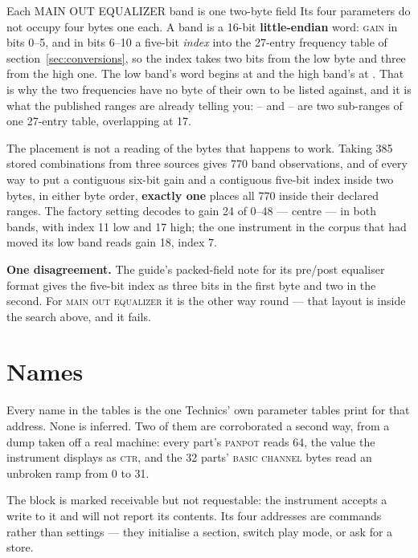 \begin{note}{Each MAIN OUT EQUALIZER band is one two-byte field}
Its four parameters do not occupy four bytes one each. A band is a 16-bit
\textbf{little-endian} word: \textsc{gain} in bits 0--5, and in bits 6--10 a five-bit
\emph{index} into the 27-entry frequency table of section~\ref{sec:conversions}, so the
index takes two bits from the low byte and three from the high one. The low band's word
begins at  and the high band's at . That is why the two
frequencies have no byte of their own to be listed against, and it is what the published
ranges are already telling you: -- and -- are two
sub-ranges of one 27-entry table, overlapping at 17.

The placement is not a reading of the bytes that happens to work. Taking 385 stored
combinations from three sources gives 770 band observations, and of every way to put a
contiguous six-bit gain and a contiguous five-bit index inside two bytes, in either byte
order, \textbf{exactly one} places all 770 inside their declared ranges. The factory
setting decodes to gain 24 of 0--48 --- centre --- in both bands, with index 11 low and 17
high; the one instrument in the corpus that had moved its low band reads gain 18, index 7.

\medskip
\textbf{One disagreement.} The guide's packed-field note for its pre/post equaliser format
gives the five-bit index as three bits in the first byte and two in the second. For
\textsc{main out equalizer} it is the other way round --- that layout is inside the search
above, and it fails.
\end{note}



\section{Names}
Every name in the tables is the one Technics' own parameter tables print for that address.
None is inferred. Two of them are corroborated a second way, from a dump taken off a real
machine: every part's \textsc{panpot} reads 64, the value the instrument displays as
\textsc{ctr}, and the 32 parts' \textsc{basic channel} bytes read an unbroken ramp from 0
to 31.

The  block is marked receivable but not requestable: the instrument accepts a
write to it and will not report its contents. Its four addresses are commands rather than
settings --- they initialise a section, switch play mode, or ask for a store.

